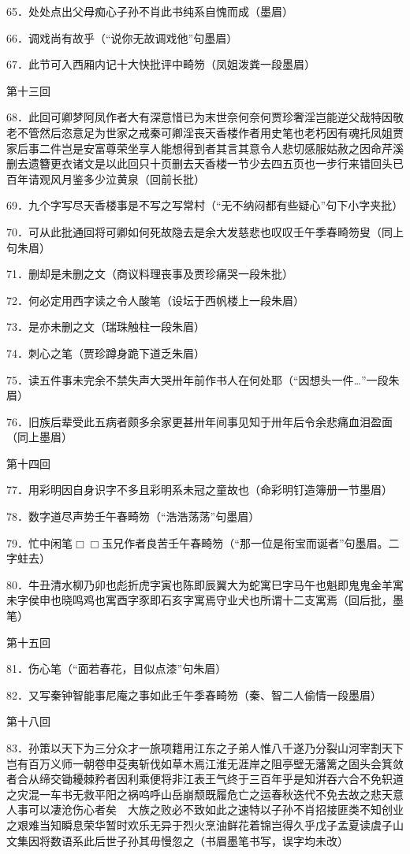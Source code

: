 65．处处点出父母痴心子孙不肖此书纯系自愧而成{（\kaishu 墨眉）}

66．调戏尚有故乎{（\kaishu “说你无故调戏他”句墨眉）}

67．此节可入西厢内记十大快批评中畸笏{（\kaishu 凤姐泼粪一段墨眉）}

第十三回

68．此回可卿梦阿凤作者大有深意惜已为末世奈何奈何贾珍奢淫岂能逆父哉特因敬老不管然后恣意足为世家之戒秦可卿淫丧天香楼作者用史笔也老朽因有魂托凤姐贾家后事二件岂是安富尊荣坐享人能想得到者其言其意令人悲切感服姑赦之因命芹溪删去遗簪更衣诸文是以此回只十页删去天香楼一节少去四五页也一步行来错回头已百年请观风月鉴多少泣黄泉{（\kaishu 回前长批）}

69．九个字写尽天香楼事是不写之写常村{（\kaishu “无不纳闷都有些疑心”句下小字夹批）}

70．可从此批通回将可卿如何死故隐去是余大发慈悲也叹叹壬午季春畸笏叟{（\kaishu 同上句朱眉）}

71．删却是未删之文{（\kaishu 商议料理丧事及贾珍痛哭一段朱批）}

72．何必定用西字读之令人酸笔{（\kaishu 设坛于西帆楼上一段朱眉）}

73．是亦未删之文{（\kaishu 瑞珠触柱一段朱眉）}

74．刺心之笔{（\kaishu 贾珍蹲身跪下道乏朱眉）}

75．读五件事未完余不禁失声大哭卅年前作书人在何处耶{（\kaishu “因想头一件\ldots{}”一段朱眉）}

76．旧族后辈受此五病者颇多余家更甚卅年间事见知于卅年后令余悲痛血泪盈面{（\kaishu 同上墨眉）}

第十四回

77．用彩明因自身识字不多且彩明系未冠之童故也{（\kaishu 命彩明钉造簿册一节墨眉）}

78．数字道尽声势壬午春畸笏{（\kaishu “浩浩荡荡”句墨眉）}

79．忙中闲笔{$\Box\Box$}玉兄作者良苦壬午春畸笏{（\kaishu “那一位是衔宝而诞者”句墨眉。二字蛀去）}

80．牛丑清水柳乃卯也彪折虎字寅也陈即辰翼大为蛇寓巳字马午也魁即鬼鬼金羊寓未字侯申也晓鸣鸡也寓酉字豕即石亥字寓焉守业犬也所谓十二支寓焉{（\kaishu 回后批，墨笔）}

第十五回

81．伤心笔{（\kaishu “面若春花，目似点漆”句朱眉）}

82．又写秦钟智能事尼庵之事如此壬午季春畸笏{（\kaishu 秦、智二人偷情一段墨眉）}

第十八回

83．孙策以天下为三分众才一旅项籍用江东之子弟人惟八千遂乃分裂山河宰割天下岂有百万义师一朝卷申芟夷斩伐如草木焉江淮无涯岸之阻亭壁无藩篱之固头会箕敛者合从缔交锄耰棘矜者因利乘便将非江表王气终于三百年乎是知洴吞六合不免轵道之灾混一车书无救平阳之祸呜呼山岳崩颓既履危亡之运春秋迭代不免去故之悲天意人事可以凄沧伤心者矣　大族之败必不致如此之速特以子孙不肖招接匪类不知创业之艰难当知瞬息荣华暂时欢乐无异于烈火烹油鲜花着锦岂得久乎戊子孟夏读虞子山文集因将数语系此后世子孙其毋慢忽之{（\kaishu 书眉墨笔书写，误字均未改）}

